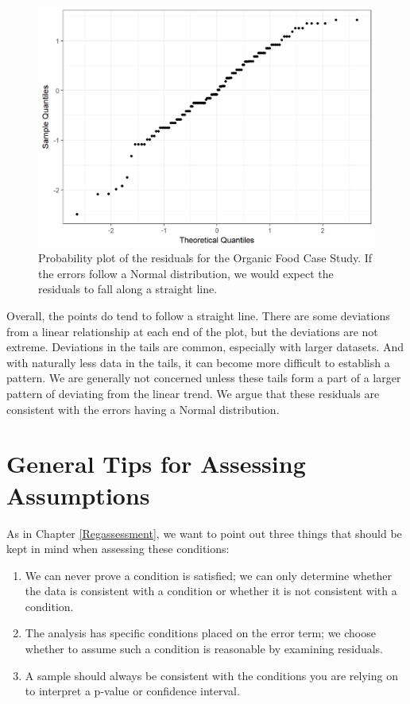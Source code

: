 \documentclass[]{book}
\providecommand{\tightlist}{%
  \setlength{\itemsep}{0pt}\setlength{\parskip}{0pt}}
\theoremstyle{plain}
\theoremstyle{mydefn}
\theoremstyle{myexmpl}
\theoremstyle{remark}
\begin{document}
\begin{figure}

{\centering \includegraphics[width=0.8\linewidth]{./Images/anovaassessment-normal-organic-1} 

}

\caption{Probability plot of the residuals for the Organic Food Case Study.  If the errors follow a Normal distribution, we would expect the residuals to fall along a straight line.}\label{fig:anovaassessment-normal-organic}
\end{figure}

Overall, the points do tend to follow a straight line. There are some
deviations from a linear relationship at each end of the plot, but the
deviations are not extreme. Deviations in the tails are common,
especially with larger datasets. And with naturally less data in the
tails, it can become more difficult to establish a pattern. We are
generally not concerned unless these tails form a part of a larger
pattern of deviating from the linear trend. We argue that these
residuals are consistent with the errors having a Normal distribution.

\section{General Tips for Assessing
Assumptions}\label{general-tips-for-assessing-assumptions-1}

As in Chapter \ref{Regassessment}, we want to point out three things
that should be kept in mind when assessing these conditions:

\begin{enumerate}
\def\labelenumi{\arabic{enumi}.}
\tightlist
\item
  We can never prove a condition is satisfied; we can only determine
  whether the data is consistent with a condition or whether it is not
  consistent with a condition.
\item
  The analysis has specific conditions placed on the error term; we
  choose whether to assume such a condition is reasonable by examining
  residuals.
\item
  A sample should always be consistent with the conditions you are
  relying on to interpret a p-value or confidence interval.
\end{enumerate}
\end{document}
